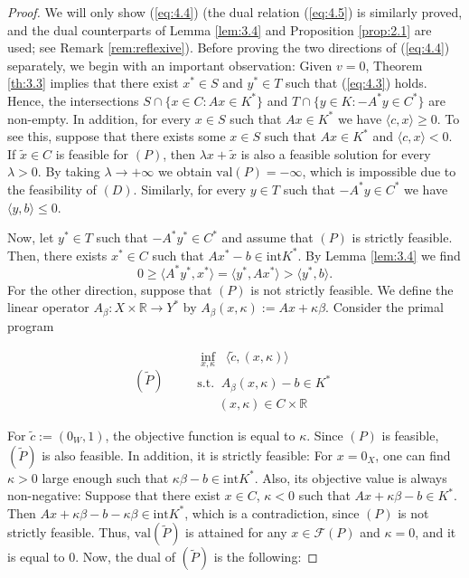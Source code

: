 \documentclass[11pt, twoside]{article}
\numberwithin{equation}{section}
\theoremstyle{definition}
\begin{document}
\begin{proof}
    We will only show (\ref{eq:4.4}) (the dual relation (\ref{eq:4.5}) is similarly proved, and the dual counterparts of Lemma \ref{lem:3.4} and Proposition \ref{prop:2.1} are used; see Remark \ref{rem:reflexive}). Before proving the two directions of (\ref{eq:4.4}) separately, we begin with an important observation: Given $v=0$, Theorem \ref{th:3.3} implies that there exist $x^*\in S$ and $y^*\in T$ such that (\ref{eq:4.3}) holds. Hence, the intersections $S\cap\{x\in C:Ax\in K^*\}$ and $T\cap\{y\in K: -A^*y\in C^*\}$ are non-empty. In addition, for every $x\in S$ such that $Ax\in K^*$ we have $\langle c,x\rangle \geq0$. To see this, suppose that there exists some $x\in S$ such that $Ax\in K^*$ and $\langle c,x\rangle<0$. If $\tilde{x}\in C$ is feasible for \hyperlink{primal}{$(P)$}, then $\lambda x+\tilde{x}$ is also a feasible solution for every $\lambda>0$. By taking $\lambda\rightarrow +\infty$ we obtain $\text{val}(P)=-\infty$, which is impossible due to the feasibility of \hyperlink{dual}{$(D)$}. Similarly, for every $y\in T$ such that $-A^*y\in C^*$ we have $\langle y,b\rangle\leq0$.\par
 Now, let $y^*\in T$
 such that $-A^*y^*\in C^*$ and assume that \hyperlink{primal}{$(P)$} is strictly feasible. Then, there exists $x^*\in C$ such that $Ax^*-b\in \text{int}K^*$. By Lemma \ref{lem:3.4} we find
 \begin{equation}
     0\geq \langle A^*y^*,x^*\rangle=\langle y^*,Ax^*\rangle>\langle y^*,b\rangle.
 \end{equation}
 For the other direction, suppose that \hyperlink{primal}{$(P)$} is not strictly feasible. We define the linear operator $A_\beta:X\times\mathbb{R}\rightarrow Y^*$ by $A_\beta(x,\kappa):= Ax+\kappa\beta$.
   Consider the primal program
   \begin{center}\hypertarget{primaltilde}{}
\vspace{-0.7cm}\begin{equation*}{(\widetilde{P})\;\;\;\;\;\;\;\;}
\begin{array}{ll}
    \inf\limits_{x,\kappa}\;\; \langle \widetilde{c},(x,\kappa)\rangle\\
    \text{s.t.}\;\; A_\beta(x,\kappa)-b\in K^*\\ \;\;\;\;\;\;(x,\kappa)\in C\times\mathbb{R}
    \end{array}
\end{equation*}
\end{center}
For $\widetilde{c}:= (0_W,1)$, the objective function is equal to $\kappa$. Since \hyperlink{primal}{$(P)$} is feasible, \hyperlink{primaltilde}{$(\widetilde{P})$} is also feasible. In addition, it is strictly feasible: For $x=0_X$, one can find $\kappa>0$ large enough such that $\kappa\beta-b\in \text{int}K^*$. Also, its objective value is always non-negative: Suppose that there exist $x\in C$, $\kappa<0$ such that $Ax+\kappa\beta-b\in K^*$. Then $Ax+\kappa\beta -b -\kappa\beta\in \text{int}K^*$, which is a contradiction, since \hyperlink{primal}{$(P)$} is not strictly feasible. Thus, $\text{val}(\widetilde{P})$ is attained for any $x\in \mathcal{F}(P)$ and $\kappa=0$, and it is equal to $0$. Now, the dual of \hyperlink{primaltilde}{$(\widetilde{P})$} is the following:

\end{proof}
\end{document}
